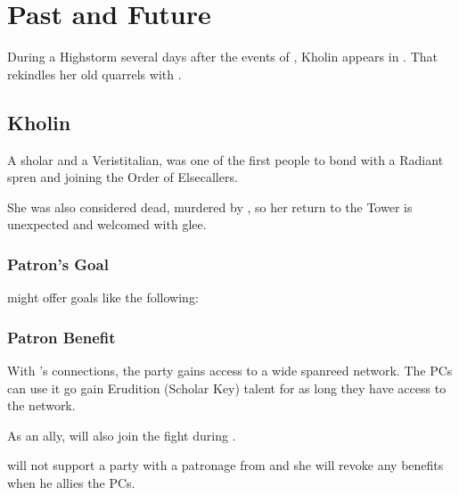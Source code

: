 \section{Past and Future}
\label{sec:jasnahVsSonsOfHonor}

During a Highstorm several days after the events of , \npcJasnah{} Kholin appears in \locationUrithiru{}. That rekindles her old quarrels with \npcAmaram{}.




\subsection{\npcJasnahName{} Kholin}

A sholar and a Veristitalian, \npcJasnah{} was one of the first people to bond with a Radiant spren and joining the Order of Elsecallers.

She was also considered dead, murdered by \npcFractionGhostbloods{}, so her return to the Tower is unexpected and welcomed with glee.

\subsubsection{Patron's Goal}

\npcJasnah{} might offer goals like the following:


\subsubsection{Patron Benefit}

With \npcJasnah{}'s connections, the party gains access to a wide spanreed network. The PCs can use it go gain Erudition (Scholar Key) talent for as long they have access to the network.

As an ally, \npcJasnah{} will also join the fight during .

\npcJasnah{} will not support a party with a patronage from \npcAmaram{} and she will revoke any benefits when he allies the PCs.





\subsection{\npcAmaramName{}}

